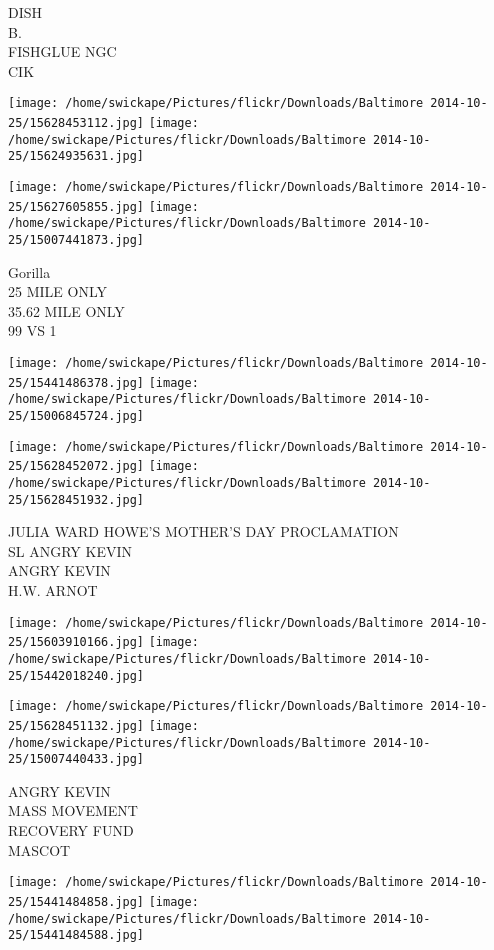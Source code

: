 \documentclass[10pt,letterpaper]{article}
\begin{document}
DISH\\
B.\\
FISHGLUE NGC\\
CIK
\pagebreak

\texttt{[image: /home/swickape/Pictures/flickr/Downloads/Baltimore 2014-10-25/15628453112.jpg]}
\texttt{[image: /home/swickape/Pictures/flickr/Downloads/Baltimore 2014-10-25/15624935631.jpg]}

\texttt{[image: /home/swickape/Pictures/flickr/Downloads/Baltimore 2014-10-25/15627605855.jpg]}
\texttt{[image: /home/swickape/Pictures/flickr/Downloads/Baltimore 2014-10-25/15007441873.jpg]}

Gorilla\\
25 MILE ONLY\\
35.62 MILE ONLY\\
99 VS 1
\pagebreak

\texttt{[image: /home/swickape/Pictures/flickr/Downloads/Baltimore 2014-10-25/15441486378.jpg]}
\texttt{[image: /home/swickape/Pictures/flickr/Downloads/Baltimore 2014-10-25/15006845724.jpg]}

\texttt{[image: /home/swickape/Pictures/flickr/Downloads/Baltimore 2014-10-25/15628452072.jpg]}
\texttt{[image: /home/swickape/Pictures/flickr/Downloads/Baltimore 2014-10-25/15628451932.jpg]}

JULIA WARD HOWE'S MOTHER'S DAY PROCLAMATION\\
SL ANGRY KEVIN\\
ANGRY KEVIN\\
H.W. ARNOT
\pagebreak

\texttt{[image: /home/swickape/Pictures/flickr/Downloads/Baltimore 2014-10-25/15603910166.jpg]}
\texttt{[image: /home/swickape/Pictures/flickr/Downloads/Baltimore 2014-10-25/15442018240.jpg]}

\texttt{[image: /home/swickape/Pictures/flickr/Downloads/Baltimore 2014-10-25/15628451132.jpg]}
\texttt{[image: /home/swickape/Pictures/flickr/Downloads/Baltimore 2014-10-25/15007440433.jpg]}

ANGRY KEVIN\\
MASS MOVEMENT\\
RECOVERY FUND\\
MASCOT
\pagebreak

\texttt{[image: /home/swickape/Pictures/flickr/Downloads/Baltimore 2014-10-25/15441484858.jpg]}
\texttt{[image: /home/swickape/Pictures/flickr/Downloads/Baltimore 2014-10-25/15441484588.jpg]}
\end{document}
